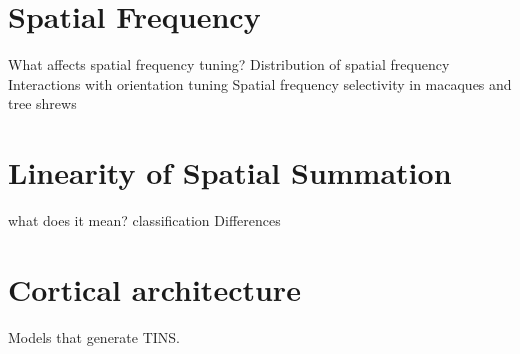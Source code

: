 \section{Spatial Frequency}

What affects spatial frequency tuning?
Distribution of spatial frequency
Interactions with orientation tuning
Spatial frequency selectivity in macaques and tree shrews

\section{Linearity of Spatial Summation}

what does it mean?
classification
Differences

\section{Cortical architecture}

Models that generate
TINS.